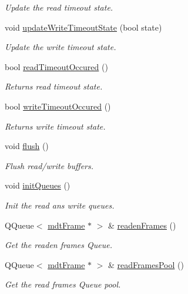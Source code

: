 \begin{DoxyCompactItemize}
\begin{DoxyCompactList}\small\item\em Update the read timeout state. \end{DoxyCompactList}\item 
void \hyperlink{classmdt_abstract_port_ab51135de1f7bbc4707c3284f924c98dc}{updateWriteTimeoutState} (bool state)
\begin{DoxyCompactList}\small\item\em Update the write timeout state. \end{DoxyCompactList}\item 
bool \hyperlink{classmdt_abstract_port_aec94143165e486cbbe6e0979be887c7e}{readTimeoutOccured} ()
\begin{DoxyCompactList}\small\item\em Returns read timeout state. \end{DoxyCompactList}\item 
bool \hyperlink{classmdt_abstract_port_a7c05a1abe77f0c3c334016c6ad866f67}{writeTimeoutOccured} ()
\begin{DoxyCompactList}\small\item\em Returns write timeout state. \end{DoxyCompactList}\item 
void \hyperlink{classmdt_abstract_port_abde440c49b95833f821e1333c40a7398}{flush} ()
\begin{DoxyCompactList}\small\item\em Flush read/write buffers. \end{DoxyCompactList}\item 
void \hyperlink{classmdt_abstract_port_adf06d095d6c3e6ce939a3998bcf8b829}{initQueues} ()
\begin{DoxyCompactList}\small\item\em Init the read ans write queues. \end{DoxyCompactList}\item 
QQueue$<$ \hyperlink{classmdt_frame}{mdtFrame} $\ast$ $>$ \& \hyperlink{classmdt_abstract_port_a05356a33dc546a11d2794a0419d749e0}{readenFrames} ()
\begin{DoxyCompactList}\small\item\em Get the readen frames Queue. \end{DoxyCompactList}\item 
QQueue$<$ \hyperlink{classmdt_frame}{mdtFrame} $\ast$ $>$ \& \hyperlink{classmdt_abstract_port_a3850ab819a8fc5dad22af14b74c45274}{readFramesPool} ()
\begin{DoxyCompactList}\small\item\em Get the read frames Queue pool. \end{DoxyCompactList}\item 

\end{DoxyCompactItemize}
